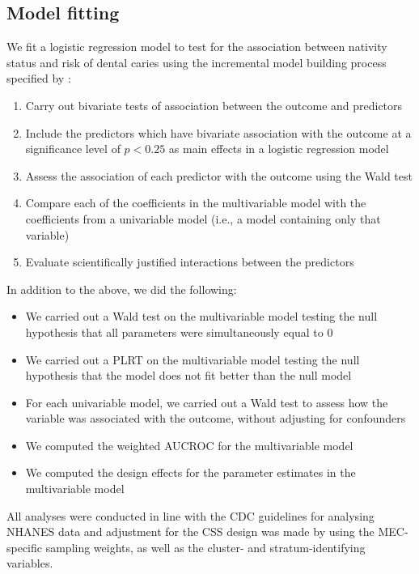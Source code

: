 \subsection{Model fitting}

We fit a logistic regression model to test for the association between nativity status and risk of dental caries using the incremental model building process specified by \citet{hosmer2000}:

\begin{enumerate}
	\item Carry out bivariate tests of association between the outcome and predictors
	\item Include the predictors which have bivariate association with the outcome at a significance level of $p < 0.25$ as main effects in a logistic regression model
	\item Assess the association of each predictor with the outcome using the Wald test
	\item Compare each of the coefficients in the multivariable model with the coefficients from a univariable model (i.e., a model containing only that variable)
	\item Evaluate scientifically justified interactions between the predictors
\end{enumerate}

In addition to the above, we did the following:

\begin{itemize}
	\item We carried out a Wald test on the multivariable model testing the null hypothesis that all parameters were simultaneously equal to 0
	\item We carried out a PLRT on the multivariable model testing the null hypothesis that the model does not fit better than the null model
	\item For each univariable model, we carried out a Wald test to assess how the variable was associated with the outcome, without adjusting for confounders
	\item We computed the weighted AUCROC for the multivariable model
	\item We computed the design effects for the parameter estimates in the multivariable model
\end{itemize}

All analyses were conducted in line with the CDC guidelines for analysing NHANES data and adjustment for the CSS design was made by using the MEC-specific sampling weights, as well as the cluster- and stratum-identifying variables.